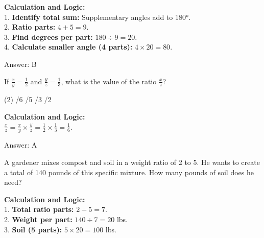 \documentclass[11pt,paper=a4,answers]{exam}
\begin{document}
\begin{questions}
\begin{solution}
\textbf{Calculation and Logic:} \\
1. \textbf{Identify total sum:} Supplementary angles add to 180°. \\
2. \textbf{Ratio parts:} $4 + 5 = 9$. \\
3. \textbf{Find degrees per part:} $180 \div 9 = 20$. \\
4. \textbf{Calculate smaller angle (4 parts):} $4 \times 20 = 80$.

\vspace{30pt}

Answer: \colorbox{yellow!100}{B}
\end{solution}

\vspace{60pt}

\question
If $\frac{x}{y} = \frac{1}{2}$ and $\frac{y}{z} = \frac{1}{3}$, what is the value of the ratio $\frac{x}{z}$?
\begin{tasks}(2)
    /6
    /5
    /3
    /2
\end{tasks}

\begin{solution}
\textbf{Calculation and Logic:} \\
$\frac{x}{z} = \frac{x}{y} \times \frac{y}{z} = \frac{1}{2} \times \frac{1}{3} = \frac{1}{6}$.

\vspace{30pt}

Answer: \colorbox{yellow!100}{A}
\end{solution}

\vspace{60pt}

\question
A gardener mixes compost and soil in a weight ratio of 2 to 5. He wants to create a total of 140 pounds of this specific mixture. How many pounds of soil does he need?

\begin{solution}
\textbf{Calculation and Logic:} \\
1. \textbf{Total ratio parts:} $2 + 5 = 7$. \\
2. \textbf{Weight per part:} $140 \div 7 = 20$ lbs. \\
3. \textbf{Soil (5 parts):} $5 \times 20 = 100$ lbs.

\vspace{30pt}


\end{solution}
\end{questions}
\end{document}
